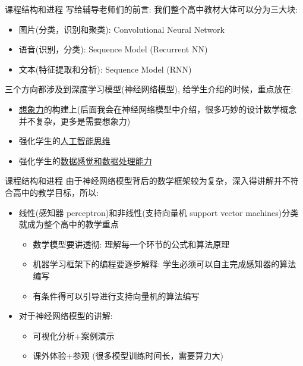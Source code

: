 \documentclass[handout]{ctexbeamer}
\begin{document}
\begin{frame}{课程结构和进程}
	写给辅导老师们的前言: 我们整个高中教材大体可以分为三大块:
	\begin{itemize}
	\setlength\itemsep{1em}
		\item 图片(分类，识别和聚类): Convolutional Neural Network
		\item 语音(识别，分类): Sequence Model (Recurrent NN)
		\item 文本(特征提取和分析): Sequence Model (RNN)
	\end{itemize}
	
	三个方向都涉及到深度学习模型(神经网络模型), 给学生介绍的时候，重点放在:
	
	\hfil
	\begin{itemize}
	\setlength\itemsep{1em}
		\item \underline{想象力}的构建上(后面我会在神经网络模型中介绍，很多巧妙的设计数学概念并不复杂，更多是需要想象力)
		\item 强化学生的\underline{人工智能思维}
		\item 强化学生的\underline{数据感觉和数据处理能力}
	\end{itemize}
\end{frame}

\begin{frame}{课程结构和进程}
由于神经网络模型背后的数学框架较为复杂，深入得讲解并不符合高中的教学目标，所以:

\hfill
\begin{itemize}
\setlength\itemsep{1em}
	\item 线性(感知器 perceptron)和非线性(支持向量机 support vector machines)分类就成为整个高中的教学重点 \begin{itemize}
	\setlength\itemsep{1em}
	\item 数学模型要讲透彻: 理解每一个环节的公式和算法原理
	\item 机器学习框架下的编程要逐步解释: 学生必须可以自主完成感知器的算法编写
	\item 有条件得可以引导进行支持向量机的算法编写
	\end{itemize}
	\item 对于神经网络模型的讲解: \begin{itemize}
	\setlength\itemsep{1em}
	\item 可视化分析+案例演示
	\item 课外体验+参观 (很多模型训练时间长，需要算力大)
	\end{itemize}
\end{itemize}	
\end{frame}
\end{document}
